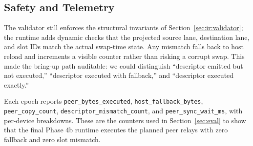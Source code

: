 \subsection{Safety and Telemetry}

The validator still enforces the structural invariants of
Section~\ref{sec:ir:validator}; the runtime adds dynamic checks that the
projected source lane, destination lane, and slot IDs match the actual
swap-time state. Any mismatch falls back to host reload and increments
a visible counter rather than risking a corrupt swap. This made the
bring-up path auditable: we could distinguish ``descriptor emitted but
not executed,'' ``descriptor executed with fallback,'' and ``descriptor
executed exactly.''

Each epoch reports
\texttt{peer\_bytes\_executed}, \texttt{host\_fallback\_bytes},
\texttt{peer\_copy\_count}, \texttt{descriptor\_mismatch\_count}, and
\texttt{peer\_sync\_wait\_ms}, with per-device breakdowns. These are
the counters used in Section~\ref{sec:eval} to show that the final
Phase 4b runtime executes the planned peer relays with zero fallback
and zero slot mismatch.
